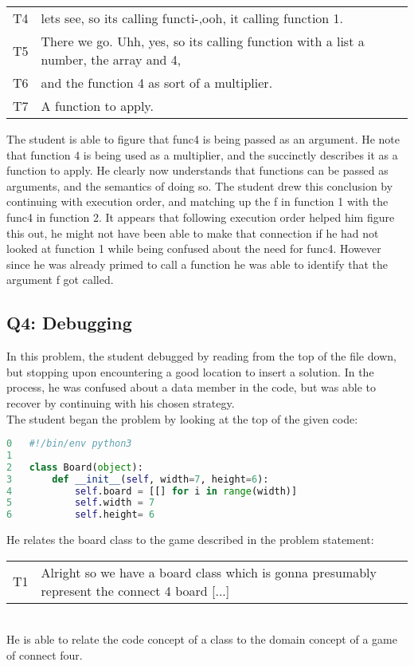 \begin{tabular}{lp{13cm}}
T4& lets see, so its calling functi-,ooh, it calling function 1.\\
T5&There we go. Uhh, yes, so its calling function with a list a number, the array and 4,\\
T6&and the function 4 as sort of a multiplier.\\
T7&A function to apply. \\
\end{tabular}

The student is able to figure that func4 is being passed as an argument.
He note that function 4 is being used as a multiplier, and the succinctly describes it as a function to apply.
He clearly now understands that functions can be passed as arguments, and the semantics of doing so.
The student drew this conclusion by continuing with execution order, and matching up the f in function 1 with the func4 in function 2.
It appears that following execution order helped him figure this out, he might not have been able to make that connection if he had not looked at function 1 while being confused about the need for func4.
However since he was already primed to call a function he was able to identify that the argument f got called.

\subsection{Q4: Debugging}
In this problem, the student debugged by reading from the top of the file down, but stopping upon encountering a good location to insert a solution. In the process, he was confused about a data member in the code, but was able to recover by continuing with his chosen strategy. \\

The student began the problem by looking at the top of the given code:
\begin{lstlisting}[language=python]
0 	#!/bin/env python3
1
2 	class Board(object):
3 		def __init__(self, width=7, height=6):
4 			self.board = [[] for i in range(width)]
5 			self.width = 7
6 			self.height= 6
\end{lstlisting}

He relates the board class to the game described in the problem statement: \\
\begin{tabular}{lp{13cm}}
T1& Alright so we have a board class which is gonna presumably represent the connect 4 board [...]\\
\end{tabular} \\
He is able to relate the code concept of a class to the domain concept of a game of connect four. \\

